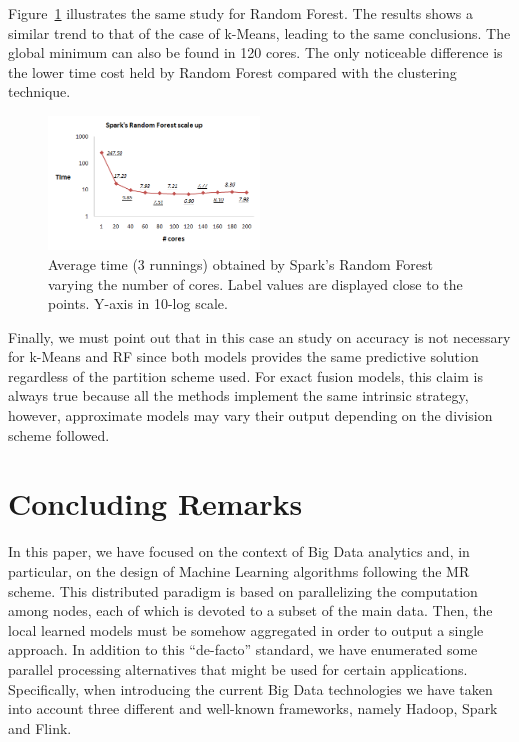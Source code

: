 \documentclass[3p,review]{elsarticle}
\begin{document}
Figure~\ref{fig:rf-spark} illustrates the same study for Random Forest. The results shows a similar trend to that of the case of k-Means, leading to the same conclusions. The global minimum can also be found in 120 cores. The only noticeable difference is the lower time cost held by Random Forest compared with the clustering technique.

\begin{figure}[!htp]
    \centering
    \includegraphics[width=0.5\textwidth]{rf-spark}
    \caption{Average time (3 runnings) obtained by Spark's Random Forest varying the number of cores. Label values are displayed close to the points. Y-axis in 10-log scale.}
    \label{fig:rf-spark}
\end{figure}

Finally, we must point out that in this case an study on accuracy is not necessary for k-Means and RF since both models provides the same predictive solution regardless of the partition scheme used. For exact fusion models, this claim is always true because all the methods implement the same intrinsic strategy, however, approximate models may vary their output depending on the division scheme followed.  

\section{Concluding Remarks}\label{sec:conclusions}

In this paper, we have focused on the context of Big Data analytics and, in particular, on the design of Machine Learning algorithms following the MR scheme. This distributed paradigm is based on parallelizing the computation among nodes, each of which is devoted to a subset of the main data. Then, the local learned models must be somehow aggregated in order to output a single approach. In addition to this ``de-facto'' standard, we have enumerated some parallel processing alternatives that might be used for certain applications. Specifically, when introducing the current Big Data technologies we have taken into account three different and well-known frameworks, namely Hadoop, Spark and Flink.
\end{document}
